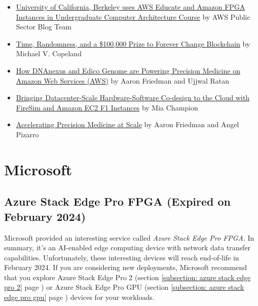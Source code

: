 \documentclass[a4paper]{article}
\begin{document}
    \begin{itemize}
        \item \href{https://aws.amazon.com/blogs/publicsector/university-of-berkeley-uses-aws-educate-for-amazon-fpga-accelerator-development-and-deployment-in-the-cloud/}{University of California, Berkeley uses AWS Educate and Amazon FPGA Instances in Undergraduate Computer Architecture Course} by AWS Public Sector Blog Team

        \item \href{https://aws.amazon.com/blogs/startups/competition-forever-change-blockchain/}{Time, Randomness, and a \$100,000 Prize to Forever Change Blockchain} by Michael V. Copeland

        \item \href{https://aws.amazon.com/blogs/apn/how-dnanexus-and-edico-genome-are-powering-precision-medicine-on-amazon-web-services-aws/}{How DNAnexus and Edico Genome are Powering Precision Medicine on Amazon Web Services (AWS)} by Aaron Friedman and Ujjwal Ratan

        \item \href{https://aws.amazon.com/blogs/compute/bringing-datacenter-scale-hardware-software-co-design-to-the-cloud-with-firesim-and-amazon-ec2-f1-instances/}{Bringing Datacenter-Scale Hardware-Software Co-design to the Cloud with FireSim and Amazon EC2 F1 Instances} by Mia Champion

        \item \href{https://aws.amazon.com/blogs/compute/accelerating-precision-medicine-at-scale/}{Accelerating Precision Medicine at Scale} by Aaron Friedman and Angel Pizarro
    \end{itemize}

    \newpage

    \section{Microsoft}

    \subsection{Azure Stack Edge Pro FPGA (Expired on February 2024)}

    Microsoft provided an interesting service called \emph{Azure Stack Edge Pro FPGA}. In summary, it's an AI-enabled edge computing device with network data transfer capabilities. Unfortunately, these interesting devices will reach end-of-life in February 2024. If you are considering new deployments, Microsoft recommend that you explore Azure Stack Edge Pro 2 (section \ref{subsection: azure stack edge pro 2} page \pageref{subsection: azure stack edge pro 2}) or Azure Stack Edge Pro GPU (section \ref{subsection: azure stack edge pro gpu} page \pageref{subsection: azure stack edge pro gpu}) devices for your workloads.\newline
\end{document}
